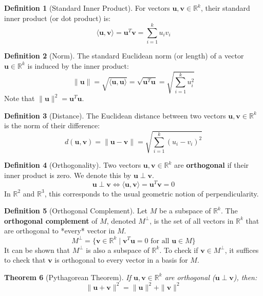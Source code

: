 \documentclass[11pt]{article}
\newtheorem{theorem}{Theorem}[section]
\theoremstyle{definition}
\newtheorem{definition}[theorem]{Definition}
\newcommand{\vect}[1]{\mathbf{#1}} %
\begin{document}
\begin{definition}[Standard Inner Product]
For vectors $\vect{u}, \vect{v} \in \mathbb{R}^k$, their standard inner product (or dot product) is:
\[ \langle \vect{u}, \vect{v} \rangle = \vect{u}^T \vect{v} = \sum_{i=1}^k u_i v_i \]
\end{definition}

\begin{definition}[Norm]
The standard Euclidean norm (or length) of a vector $\vect{u} \in \mathbb{R}^k$ is induced by the inner product:
\[ \|\vect{u}\| = \sqrt{\langle \vect{u}, \vect{u} \rangle} = \sqrt{\vect{u}^T \vect{u}} = \sqrt{\sum_{i=1}^k u_i^2} \]
Note that $\|\vect{u}\|^2 = \vect{u}^T \vect{u}$.
\end{definition}

\begin{definition}[Distance]
The Euclidean distance between two vectors $\vect{u}, \vect{v} \in \mathbb{R}^k$ is the norm of their difference:
\[ d(\vect{u}, \vect{v}) = \|\vect{u} - \vect{v}\| = \sqrt{\sum_{i=1}^k (u_i - v_i)^2} \]
\end{definition}

\begin{definition}[Orthogonality]
Two vectors $\vect{u}, \vect{v} \in \mathbb{R}^k$ are \textbf{orthogonal} if their inner product is zero. We denote this by $\vect{u} \perp \vect{v}$.
\[ \vect{u} \perp \vect{v} \iff \langle \vect{u}, \vect{v} \rangle = \vect{u}^T \vect{v} = 0 \]
In $\mathbb{R}^2$ and $\mathbb{R}^3$, this corresponds to the usual geometric notion of perpendicularity.
\end{definition}

\begin{definition}[Orthogonal Complement]
Let $M$ be a subspace of $\mathbb{R}^k$. The \textbf{orthogonal complement} of $M$, denoted $M^{\perp}$, is the set of all vectors in $\mathbb{R}^k$ that are orthogonal to *every* vector in $M$.
\[ M^{\perp} = \{ \vect{v} \in \mathbb{R}^k \mid \vect{v}^T \vect{u} = 0 \text{ for all } \vect{u} \in M \} \]
It can be shown that $M^{\perp}$ is also a subspace of $\mathbb{R}^k$. To check if $\vect{v} \in M^{\perp}$, it suffices to check that $\vect{v}$ is orthogonal to every vector in a basis for $M$.
\end{definition}

\begin{theorem}[Pythagorean Theorem]
If $\vect{u}, \vect{v} \in \mathbb{R}^k$ are orthogonal ($\vect{u} \perp \vect{v}$), then:
\[ \|\vect{u} + \vect{v}\|^2 = \|\vect{u}\|^2 + \|\vect{v}\|^2 \]
\end{theorem}
\end{document}
